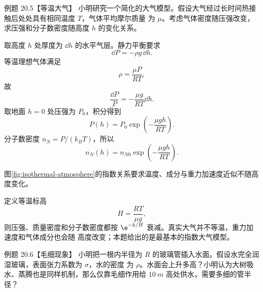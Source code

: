\begin{origexamplebox}{例题 20.5【等温大气】}
小明研究一个简化的大气模型。假设大气经过长时间热接触后处处具有相同温度 $T$，气体平均摩尔质量
为 $\mu$。考虑气体密度随压强改变，求压强和分子数密度随高度 $h$ 的变化关系。
\end{origexamplebox}

\begin{xesolution}
取高度 $h$ 处厚度为 $\dd h$ 的水平气层。静力平衡要求
\begin{equation*}
  \dd P=-\rho g\,\dd h.
\end{equation*}
等温理想气体满足
\begin{equation*}
  \rho=\frac{\mu P}{RT},
\end{equation*}
故
\begin{equation*}
  \frac{\dd P}{P}=-\frac{\mu g}{RT}\dd h.
\end{equation*}
取地面 $h=0$ 处压强为 $P_0$，积分得到
\begin{equation}
  \boxed{P(h)=P_0\exp\!\left(-\frac{\mu gh}{RT}\right)}.
\end{equation}
分子数密度 $n_N=P/(k_BT)$，所以
\begin{equation}
  \boxed{n_N(h)=n_{N0}\exp\!\left(-\frac{\mu gh}{RT}\right)}.
\end{equation}

\isothermalAtmosphereDiagram
{}\label{fig:isothermal-atmosphere}
图\ref{fig:isothermal-atmosphere}的指数关系要求温度、成分与重力加速度近似不随高度变化。

定义等温标高
\begin{equation*}
  \boxed{H=\frac{RT}{\mu g}},
\end{equation*}
则压强、质量密度和分子数密度都按 $\e^{-h/H}$ 衰减。真实大气并不等温，重力加速度和气体成分也会随
高度改变；本题给出的是最基本的指数大气模型。
\end{xesolution}

\begin{origexamplebox}{例题 20.6【毛细现象】}
小明把一根内半径为 $R$ 的玻璃管插入水面。假设水完全润湿玻璃，表面张力系数为 $\sigma$，水的密度
为 $\rho$。水面会上升多高？小明认为大树吸水、蒸腾也是同样机制，那么仅靠毛细作用给
$\SI{10}{m}$ 高处供水，需要多细的管半径？
\end{origexamplebox}

